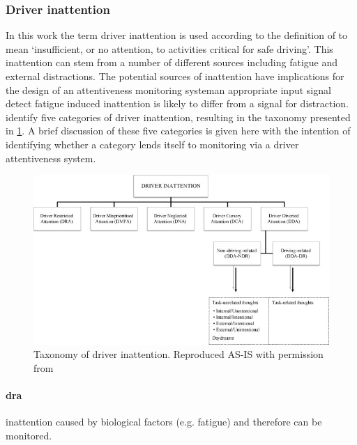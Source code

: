 \documentclass[11pt, parskip=half*,twoside=false]{scrbook}
\begin{document}

\subsubsection{Driver inattention}
In this work the term driver inattention is used according to the definition of \citet{reganDriverDistractionDriver2011} to mean `insufficient, or no attention, to activities critical for safe driving'. This inattention can stem from a number of different sources including fatigue and external distractions. The potential sources of inattention have implications for the design of an attentiveness monitoring system\textemdash an appropriate input signal detect fatigue induced inattention is likely to differ from a signal for distraction.  \citet{reganDriverDistractionDriver2011} identify five categories of driver inattention, resulting in the taxonomy presented in \cref{fig:taxonomy_inattention}. A brief discussion of these five categories is given here with the intention of identifying whether a category lends itself to monitoring via a driver attentiveness system. 

\begin{figure} 
	\centering
	\includegraphics[width=\textwidth]{driver_inattention_taxonomy} 
	\caption{Taxonomy of driver inattention. Reproduced AS-IS with permission from \citep{reganDriverDistractionDriver2011}}
	\label{fig:taxonomy_inattention}
\end{figure}

\paragraph{\gls{dra}} inattention caused by biological factors (e.g. fatigue) and therefore can be monitored.
\end{document}

